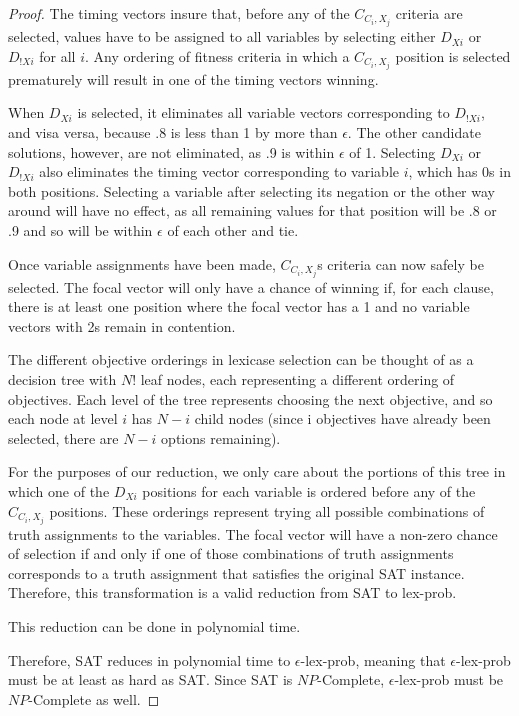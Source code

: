 \documentclass[sigconf]{acmart}
\begin{document}
\begin{proof}
The timing vectors insure that, before any of the $C_{C_{i},X_{j}}$ criteria are selected, values have to be assigned to all variables by selecting either $D_{Xi}$ or $D_{!Xi}$ for all $i$. Any ordering of fitness criteria in which a $C_{C_{i},X_{j}}$ position is selected prematurely will result in one of the timing vectors winning.

When $D_{Xi}$ is selected, it eliminates all variable vectors corresponding to $D_{!Xi}$, and visa versa, because .8 is less than 1 by more than $\epsilon$. The other candidate solutions, however, are not eliminated, as .9 is within $\epsilon$ of 1. Selecting $D_{Xi}$ or $D_{!Xi}$ also eliminates the timing vector corresponding to variable $i$, which has 0s in both positions. Selecting a variable after selecting its negation or the other way around will have no effect, as all remaining values for that position will be .8 or .9 and so will be within $\epsilon$ of each other and tie.

Once variable assignments have been made, $C_{C_{i},X_{j}}$s criteria can now safely be selected. The focal vector will only have a chance of winning if, for each clause, there is at least one position where the focal vector has a 1 and no variable vectors with 2s remain in contention.

The different objective orderings in lexicase selection can be thought of as a decision tree with $N!$ leaf nodes, each representing a different ordering of objectives. Each level of the tree represents choosing the next objective, and so each node at level $i$ has $N-i$ child nodes (since i objectives have already been selected, there are $N-i$ options remaining).

For the purposes of our reduction, we only care about the portions of this tree in which one of the $D_{Xi}$ positions for each variable is ordered before any of the $C_{C_{i},X_{j}}$ positions. These orderings represent trying all possible combinations of truth assignments to the variables. The focal vector will have a non-zero chance of selection if and only if one of those combinations of truth assignments corresponds to a truth assignment that satisfies the original {\sc SAT} instance. Therefore, this transformation is a valid reduction from {\sc SAT} to {\sc lex-prob}.

This reduction can be done in polynomial time. 

Therefore, {\sc SAT} reduces in polynomial time to {\sc $\epsilon$-lex-prob}, meaning that {\sc $\epsilon$-lex-prob} must be at least as hard as {\sc SAT}. Since {\sc SAT} is $NP$-Complete, {\sc $\epsilon$-lex-prob} must be $NP$-Complete as well.

\end{proof}
\end{document}
